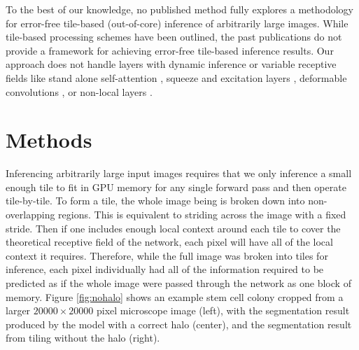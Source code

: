 \documentclass[runningheads]{llncs}
\begin{document}
To the best of our knowledge, no published method fully explores a methodology for error-free tile-based (out-of-core) inference of arbitrarily large images. While tile-based processing schemes have been outlined, the past publications do not provide a framework for achieving error-free tile-based inference results. Our approach does not handle layers with dynamic inference or variable receptive fields like stand alone self-attention \cite{Ramachandran2019b}, squeeze and excitation layers \cite{Hu2018}, deformable convolutions \cite{Dai2017}, or non-local layers \cite{Wang2018c}. 


\section{Methods}
\label{methods}

Inferencing arbitrarily large input images requires that we only inference a small enough tile to fit in GPU memory for any single forward pass and then operate tile-by-tile. To form a tile, the whole image being is broken down into non-overlapping regions. This is equivalent to striding across the image with a fixed stride. Then if one includes enough local context around each tile to cover the theoretical receptive field of the network, each pixel will have all of the local context it requires. Therefore, while the full image was broken into tiles for inference, each pixel individually had all of the information required to be predicted as if the whole image were passed through the network as one block of memory. Figure \ref{fig:nohalo} shows an example stem cell colony cropped from a larger $\num{20000} \times \num{20000}$ pixel microscope image (left), with the segmentation result produced by the model with a correct halo (center), and the segmentation result from tiling without the halo (right). 
\end{document}
